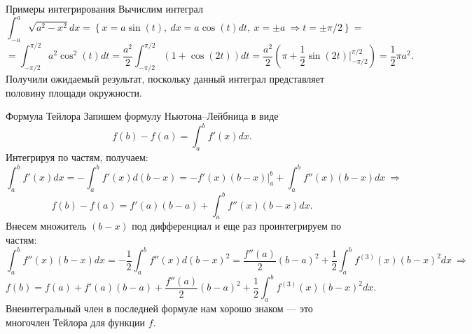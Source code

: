 \documentclass[8pt]{beamer}
\begin{document}

\begin{frame}{Примеры интегрирования}
Вычислим интеграл
$$ \int_{-a}^a \sqrt{a^2 - x^2} dx = \left\{ x = a \sin(t),\ dx = a \cos(t) dt,\ x=\pm a \ \Rightarrow t = \pm \pi/2 \right\} =$$
$$=
\int_{-\pi/2}^{\pi/2} a^2 \cos^2(t)dt =\frac{a^2}{2} \int_{-\pi/2}^{\pi/2} (1+\cos(2t))dt = \frac{a^2}{2}\left( \pi + \frac{1}{2}\sin(2t)\Big|_{-\pi/2}^{\pi/2}\right)=\frac{1}{2}\pi a^2.$$
Получили ожидаемый результат, поскольку данный интеграл представляет половину площади окружности.
\end{frame}

\begin{frame}{Формула Тейлора}
Запишем формулу Ньютона--Лейбница в виде
$$f(b) - f(a) = \int_a^b f'(x)dx.$$
Интегрируя по частям, получаем:
$$\int_a^b f'(x)dx = - \int_a^b f'(x) d(b-x) = - f'(x)(b-x)\Big|_a^b + \int_a^b f''(x) (b-x) dx \ \Rightarrow$$
$$f(b)-f(a) = f'(a)(b-a) +  \int_a^b f''(x) (b-x) dx.$$
Внесем множитель $(b-x)$ под дифференциал и еще раз проинтегрируем по частям:
$$\int_a^b f''(x) (b-x) dx = - \frac{1}{2} \int_a^b f''(x) d(b-x)^2 =
\frac{f''(a)}{2}(b-a)^2 + \frac{1}{2} \int_a^b f^{(3)}(x)(b-x)^2dx \ \Rightarrow$$
$$f(b) = f(a) + f'(a)(b-a) +  \frac{f''(a)}{2}(b-a)^2 + \frac{1}{2} \int_a^b f^{(3)}(x)(b-x)^2dx.$$
Внеинтегральный член в последней формуле нам хорошо знаком --- это многочлен Тейлора для функции $f$.
\end{frame}
\end{document}
